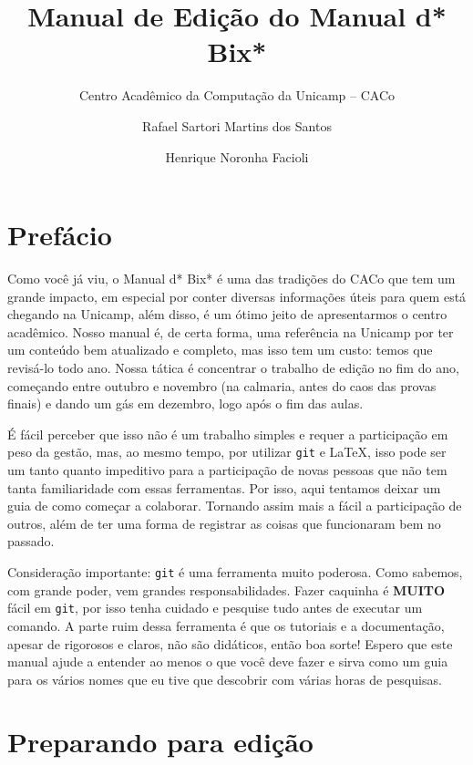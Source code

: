 \documentclass[a4paper,oneside,10pt]{memoir}
\title{Manual de Edição do Manual d* Bix*}
\author{
  Centro Acadêmico da Computação da Unicamp -- CACo
  \and
  Rafael Sartori Martins dos Santos
  \and
  Henrique Noronha Facioli
}
\date{\the\year}
\begin{document}
\maketitle

\frontmatter
\tableofcontents

\chapter{Prefácio}

Como você já viu, o Manual d* Bix* é uma das tradições do CACo que tem um
grande impacto, em especial por conter diversas informações úteis para quem
está chegando na Unicamp, além disso, é um ótimo jeito de apresentarmos o
centro acadêmico. Nosso manual é, de certa forma, uma referência na Unicamp por
ter um conteúdo bem atualizado e completo, mas isso tem um custo: temos que
revisá-lo todo ano. Nossa tática é concentrar o trabalho de edição no fim do
ano, começando entre outubro e novembro (na calmaria, antes do caos das provas
finais) e dando um gás em dezembro, logo após o fim das aulas.

É fácil perceber que isso não é um trabalho simples e requer a participação em
peso da gestão, mas, ao mesmo tempo, por utilizar \texttt{git} e \LaTeX, isso
pode ser um tanto quanto impeditivo para a participação de novas pessoas que
não tem tanta familiaridade com essas ferramentas. Por isso, aqui tentamos
deixar um guia de como começar a colaborar. Tornando assim mais a fácil a
participação de outros, além de ter uma forma de registrar as coisas que
funcionaram bem no passado.

Consideração importante: \texttt{git} é uma ferramenta muito poderosa. Como
sabemos, com grande poder, vem grandes responsabilidades. Fazer caquinha é
\textbf{MUITO} fácil em \texttt{git}, por isso tenha cuidado e pesquise tudo
antes de executar um comando. A parte ruim dessa ferramenta é que os tutoriais
e a documentação, apesar de rigorosos e claros, não são didáticos, então boa
sorte! Espero que este manual ajude a entender ao menos o que você deve fazer e
sirva como um guia para os vários nomes que eu tive que descobrir com várias
horas de pesquisas.

\mainmatter

\chapter{Preparando para edição}
\end{document}
